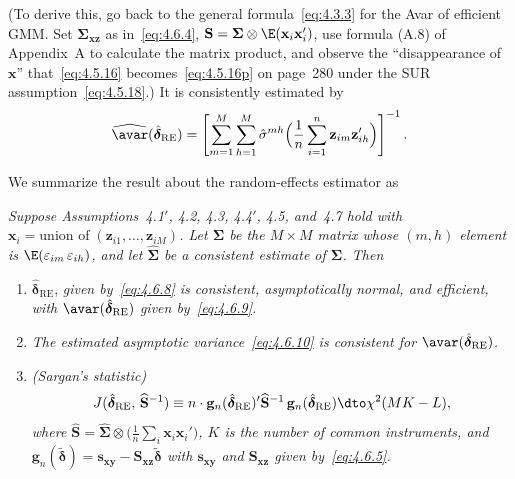 (To derive this, go back to the general formula~\eqref{eq:4.3.3} for the Avar of
efficient GMM. Set $\boldsymbol{\Sigma}_{\mathbf{xz}}$ as in~\eqref{eq:4.6.4},
$\mathbf{S} = \boldsymbol{\Sigma} \otimes \E(\mathbf{x}_i \mathbf{x}_i')$,
use formula (A.8) of Appendix~A to calculate the matrix product, and observe the
``disappearance of $\mathbf{x}$'' that~\eqref{eq:4.5.16} becomes~\eqref{eq:4.5.16p}
on page~280 under the SUR assumption~\eqref{eq:4.5.18}.)
It is consistently estimated by
\begin{equation}
\widehat{\avar}(\hat{\boldsymbol{\delta}}_{\mathrm{RE}})
= \left[\sum_{m=1}^{M} \sum_{h=1}^{M}
\hat{\sigma}^{mh} \Bigl(\frac{1}{n} \sum_{i=1}^{n}
\mathbf{z}_{im} \mathbf{z}_{ih}'\Bigr)\right]^{-1}.
\label{eq:4.6.10}
\end{equation}

We summarize the result about the random-effects estimator as

\begin{proposition}
\label{prop:4.7}
\textit{Suppose Assumptions~4.1$'$, 4.2, 4.3, 4.4$'$, 4.5, and~4.7 hold with
$\mathbf{x}_i = \text{union of}\; (\mathbf{z}_{i1}, \ldots, \mathbf{z}_{iM})$.
Let\/ $\boldsymbol{\Sigma}$ be the $M \times M$ matrix whose $(m,h)$ element is
$\E(\varepsilon_{im}\, \varepsilon_{ih})$, and let\/ $\widehat{\boldsymbol{\Sigma}}$
be a consistent estimate of\/ $\boldsymbol{\Sigma}$. Then}
\begin{enumerate}[label=(\alph*)]
\item $\hat{\boldsymbol{\delta}}_{\mathrm{RE}}$, \textit{given by~\eqref{eq:4.6.8}
is consistent, asymptotically normal, and efficient, with\/
$\avar(\hat{\boldsymbol{\delta}}_{\mathrm{RE}})$ given by~\eqref{eq:4.6.9}.}

\item \textit{The estimated asymptotic variance~\eqref{eq:4.6.10} is consistent for\/
$\avar(\hat{\boldsymbol{\delta}}_{\mathrm{RE}})$.}

\item \textit{(Sargan's statistic)}
\[
J(\hat{\boldsymbol{\delta}}_{\mathrm{RE}},\, \widehat{\mathbf{S}}^{-1})
\equiv n \cdot \mathbf{g}_n(\hat{\boldsymbol{\delta}}_{\mathrm{RE}})'
\widehat{\mathbf{S}}^{-1}\, \mathbf{g}_n(\hat{\boldsymbol{\delta}}_{\mathrm{RE}})
\dto \chi^2(MK - L),
\]
\textit{where\/ $\widehat{\mathbf{S}} = \widehat{\boldsymbol{\Sigma}} \otimes
\bigl(\frac{1}{n} \sum_i \mathbf{x}_i \mathbf{x}_i'\bigr)$,
$K$ is the number of common instruments, and\/
$\mathbf{g}_n(\tilde{\boldsymbol{\delta}}) = \mathbf{s}_{\mathbf{xy}} -
\mathbf{S}_{\mathbf{xz}} \tilde{\boldsymbol{\delta}}$ with\/
$\mathbf{s}_{\mathbf{xy}}$ and\/ $\mathbf{S}_{\mathbf{xz}}$ given
by~\eqref{eq:4.6.5}.}
\end{enumerate}
\end{proposition}

